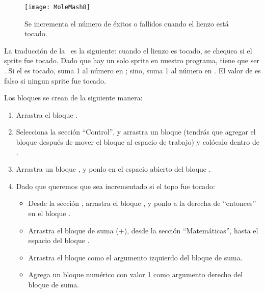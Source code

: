 {\begin{figure}[H]
\centering
\texttt{[image: MoleMash8]}
\caption{Se incrementa el número de éxitos o fallidos cuando el lienzo está tocado.}
\label{fig:MoleMash8}
\end{figure}

La traducción de la~ es la siguiente: cuando el
lienzo es tocado, se chequea si el sprite fue tocado. Dado que hay un
solo sprite en nuestro programa, tiene que ser . Si
el  es tocado, suma 1 al número en
; sino, suma 1 al número en
  . El valor
  de  es falso si ningun sprite fue tocado.

Los bloques se crean de la siguiente manera:

\begin{enumerate}

\item Arrastra el bloque .

\item Selecciona la sección ``Control'', y arrastra un bloque
   (tendrás que agregar el bloque  después
  de mover el bloque al espacio de trabajo) y colócalo dentro de
  .

\item Arrastra un bloque , y ponlo en el
  espacio abierto del bloque .

\item Dado que queremos que  sea
  incrementado si el topo fue tocado:

\begin{itemize}

\item Desde la sección , arrastra el
  bloque , y ponlo a la
  derecha de ``entonces'' en el bloque .

\item Arrastra el bloque de suma (+), desde la sección
  ``Matemáticas'', hasta el espacio del bloque .

\item Arrastra el bloque  como el
  argumento izquierdo del bloque de suma.

\item Agrega un bloque numérico con valor 1 como argumento derecho del
  bloque de suma.


\end{itemize}
\end{enumerate}}
